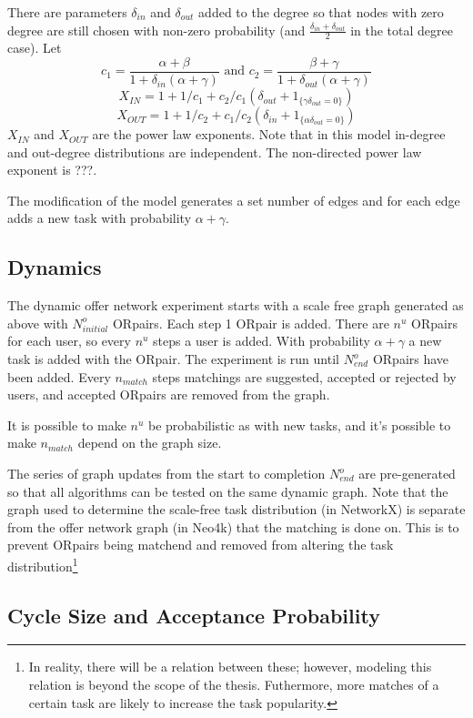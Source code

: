 \documentclass[main.tex]{subfiles}
\begin{document}
There are parameters $\delta_{in}$ and $\delta_{out}$ added to the degree so that nodes with zero degree are still chosen with non-zero probability (and $\frac{\delta_{in} + \delta_{out}}{2}$ in the total degree case). Let
$$c_1 = \frac{\alpha + \beta}{1 + \delta_{in}(\alpha + \gamma)} \mbox{ and } c_2 = \frac{\beta + \gamma}{1 + \delta_{out}(\alpha + \gamma)}$$
$$X_{IN} = 1 + 1/c_1 + c_2/c_1(\delta_{out} + 1_{\{\gamma \delta_{out}=0\}})$$
$$X_{OUT} = 1 + 1/c_2 + c_1/c_2(\delta_{in} + 1_{\{\alpha \delta_{out}=0\}})$$
$X_{IN}$ and $X_{OUT}$ are the power law exponents. Note that in this model in-degree and out-degree distributions are independent. The non-directed power law exponent is ???.

The modification of the model generates a set number of edges and for each edge adds a new task with probability $\alpha + \gamma$.

\subsection{Dynamics}
The dynamic offer network experiment starts with a scale free graph generated as above with $N^o_{initial}$ ORpairs. Each step 1 ORpair is added. There are $n^u$ ORpairs for each user, so every $n^u$ steps a user is added. With probability $\alpha + \gamma$ a new task is added with the ORpair. The experiment is run until $N^o_{end}$ ORpairs have been added. Every $n_{match}$ steps matchings are suggested, accepted or rejected by users, and accepted ORpairs are removed from the graph.

It is possible to make $n^u$ be probabilistic as with new tasks, and it's possible to make $n_{match}$ depend on the graph size.

The series of graph updates from the start to completion $N_{end}^o$ are pre-generated so that all algorithms can be tested on the same dynamic graph. Note that the graph used to determine the scale-free task distribution (in NetworkX) is separate from the offer network graph (in Neo4k) that the matching is done on. This is to prevent ORpairs being matchend and removed from altering the task distribution\footnote{In reality, there will be a relation between these; however, modeling this relation is beyond the scope of the thesis. Futhermore, more matches of a certain task are likely to increase the task popularity.}

\subsection{Cycle Size and Acceptance Probability}
\end{document}
